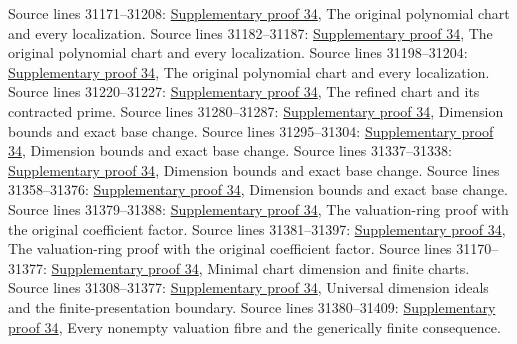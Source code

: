 \begin{AlgebraSourceRoutes}
 Source lines 31171--31208: \hyperlink{algebra_fibre_dimension_notes_20260928}{Supplementary proof 34}, The original polynomial chart and every localization.
 Source lines 31182--31187: \hyperlink{algebra_fibre_dimension_notes_20260928}{Supplementary proof 34}, The original polynomial chart and every localization.
 Source lines 31198--31204: \hyperlink{algebra_fibre_dimension_notes_20260928}{Supplementary proof 34}, The original polynomial chart and every localization.
 Source lines 31220--31227: \hyperlink{algebra_fibre_dimension_notes_20260928}{Supplementary proof 34}, The refined chart and its contracted prime.
 Source lines 31280--31287: \hyperlink{algebra_fibre_dimension_notes_20260928}{Supplementary proof 34}, Dimension bounds and exact base change.
 Source lines 31295--31304: \hyperlink{algebra_fibre_dimension_notes_20260928}{Supplementary proof 34}, Dimension bounds and exact base change.
 Source lines 31337--31338: \hyperlink{algebra_fibre_dimension_notes_20260928}{Supplementary proof 34}, Dimension bounds and exact base change.
 Source lines 31358--31376: \hyperlink{algebra_fibre_dimension_notes_20260928}{Supplementary proof 34}, Dimension bounds and exact base change.
 Source lines 31379--31388: \hyperlink{algebra_fibre_dimension_notes_20260928}{Supplementary proof 34}, The valuation-ring proof with the original coefficient factor.
 Source lines 31381--31397: \hyperlink{algebra_fibre_dimension_notes_20260928}{Supplementary proof 34}, The valuation-ring proof with the original coefficient factor.
 Source lines 31170--31377: \hyperlink{algebra_fibre_dimension_notes_20260928}{Supplementary proof 34}, Minimal chart dimension and finite charts.
 Source lines 31308--31377: \hyperlink{algebra_fibre_dimension_notes_20260928}{Supplementary proof 34}, Universal dimension ideals and the finite-presentation boundary.
 Source lines 31380--31409: \hyperlink{algebra_fibre_dimension_notes_20260928}{Supplementary proof 34}, Every nonempty valuation fibre and the generically finite consequence.
\end{AlgebraSourceRoutes}

